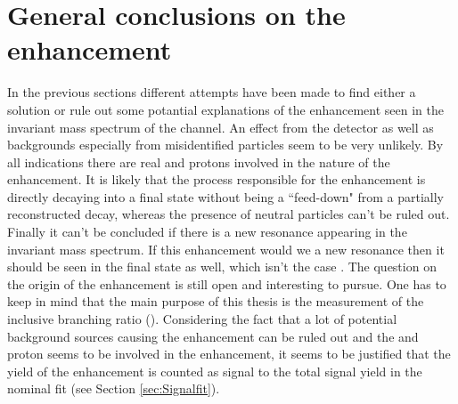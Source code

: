 \section{General conclusions on the enhancement}
In the previous sections different attempts have been made to find either a solution or rule out some potantial explanations of the enhancement seen in the invariant \Dz\proton mass spectrum of the \LbToDpmunuX channel.
An effect from the detector as well as backgrounds especially from misidentified particles seem to be very unlikely.
By all indications there are real \Dz and protons involved in the nature of the enhancement.
It is likely that the process responsible for the enhancement is directly decaying into a \Dz\proton final state without being a ``feed-down" from a partially reconstructed decay, whereas the presence of neutral particles can't be ruled out.
Finally it can't be concluded if there is a new resonance appearing in the invariant \Dz\proton mass spectrum.
If this enhancement would we a new \Lc resonance then it should be seen in the \Lc\pip\pim final state as well, which isn't the case \cite{PDG}.
The question on the origin of the enhancement is still open and interesting to pursue.
One has to keep in mind that the main purpose of this thesis is the measurement of the inclusive branching ratio \BR(\LbToDpmunuX). 
Considering the fact that a lot of potential background sources causing the enhancement can be ruled out and the \Dz and proton seems to be involved in the enhancement, it seems to be justified that the yield of the enhancement is counted as signal to
the total signal yield \NDp in the nominal fit (see Section \ref{sec:Signalfit}). 
